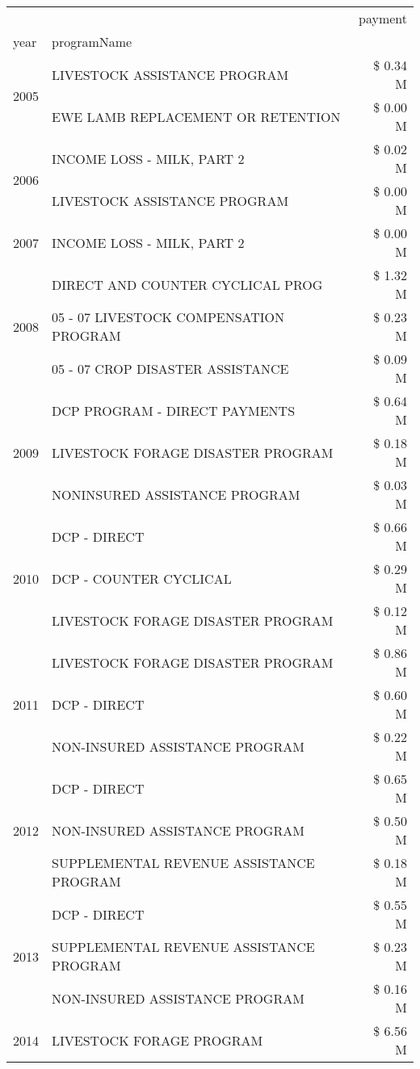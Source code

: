 \begin{tabular}{llr}
\toprule
 &  & payment \\
year & programName &  \\
\midrule
\multirow[t]{2}{*}{2005} & LIVESTOCK ASSISTANCE PROGRAM & \$ 0.34 M \\
 & EWE LAMB REPLACEMENT OR RETENTION & \$ 0.00 M \\
\cline{1-3}
\multirow[t]{2}{*}{2006} & INCOME LOSS - MILK, PART 2 & \$ 0.02 M \\
 & LIVESTOCK ASSISTANCE PROGRAM & \$ 0.00 M \\
\cline{1-3}
2007 & INCOME LOSS - MILK, PART 2 & \$ 0.00 M \\
\cline{1-3}
\multirow[t]{3}{*}{2008} & DIRECT AND COUNTER CYCLICAL PROG & \$ 1.32 M \\
 & 05 - 07 LIVESTOCK COMPENSATION PROGRAM & \$ 0.23 M \\
 & 05 - 07 CROP DISASTER ASSISTANCE & \$ 0.09 M \\
\cline{1-3}
\multirow[t]{3}{*}{2009} & DCP PROGRAM - DIRECT PAYMENTS & \$ 0.64 M \\
 & LIVESTOCK FORAGE DISASTER  PROGRAM & \$ 0.18 M \\
 & NONINSURED ASSISTANCE PROGRAM & \$ 0.03 M \\
\cline{1-3}
\multirow[t]{3}{*}{2010} & DCP - DIRECT & \$ 0.66 M \\
 & DCP - COUNTER CYCLICAL & \$ 0.29 M \\
 & LIVESTOCK FORAGE DISASTER PROGRAM & \$ 0.12 M \\
\cline{1-3}
\multirow[t]{3}{*}{2011} & LIVESTOCK FORAGE DISASTER PROGRAM & \$ 0.86 M \\
 & DCP - DIRECT & \$ 0.60 M \\
 & NON-INSURED ASSISTANCE PROGRAM & \$ 0.22 M \\
\cline{1-3}
\multirow[t]{3}{*}{2012} & DCP - DIRECT & \$ 0.65 M \\
 & NON-INSURED ASSISTANCE PROGRAM & \$ 0.50 M \\
 & SUPPLEMENTAL REVENUE ASSISTANCE PROGRAM & \$ 0.18 M \\
\cline{1-3}
\multirow[t]{3}{*}{2013} & DCP - DIRECT & \$ 0.55 M \\
 & SUPPLEMENTAL REVENUE ASSISTANCE PROGRAM & \$ 0.23 M \\
 & NON-INSURED ASSISTANCE PROGRAM & \$ 0.16 M \\
\cline{1-3}
\multirow[t]{3}{*}{2014} & LIVESTOCK FORAGE PROGRAM & \$ 6.56 M \\

\end{tabular}

